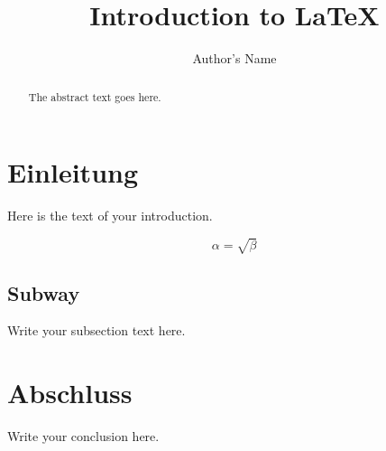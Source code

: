 \documentclass{article}
\begin{document}
\title{Introduction to \LaTeX{}}
\author{Author's Name}

\maketitle

\begin{abstract}
The abstract text goes here.
\end{abstract}

\tableofcontents

\section{Einleitung}
Here is the text of your introduction.

\begin{equation}
    \label{simple_equation}
    \alpha = \sqrt{ \beta }
\end{equation}

\subsection{Subway}
Write your subsection text here.

\section{Abschluss}
Write your conclusion here.
\end{document}
